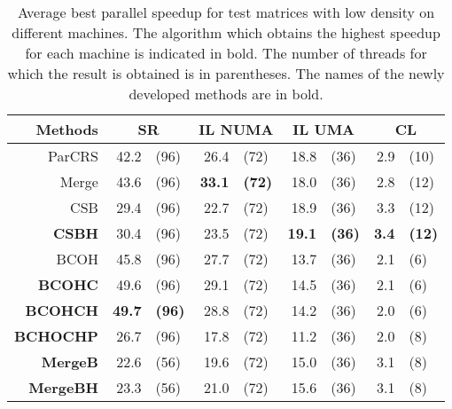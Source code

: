 \begin{table}
    \centering
    \small
    \caption{Average best parallel speedup for test matrices with low density on different machines. The algorithm which obtains the highest speedup for each machine is indicated in bold. The number of threads for which the result is obtained is in parentheses. The names of the newly developed methods are in bold.}\label{tab:AggregateResultsL}
    \begin{tabular}{r r@{ }l r@{ }l r@{ }lr@{ }l }
        Methods & \multicolumn{2}{c}{SR} & \multicolumn{2}{c}{IL NUMA} & \multicolumn{2}{c}{IL UMA} & \multicolumn{2}{c}{CL}\\
        \midrule
        ParCRS           & 42.2          & (96)          & 26.4          & (72)          & 18.8          & (36)          & 2.9          & (10) \\
        Merge            & 43.6          & (96)          & \textbf{33.1} & \textbf{(72)} & 18.0          & (36)          & 2.8          & (12) \\
        CSB              & 29.4          & (96)          & 22.7          & (72)          & 18.9          & (36)          & 3.3          & (12) \\
        \textbf{CSBH}    & 30.4          & (96)          & 23.5          & (72)          & \textbf{19.1} & \textbf{(36)} & \textbf{3.4} & \textbf{(12)} \\
        BCOH             & 45.8          & (96)          & 27.7          & (72)          & 13.7          & (36)          & 2.1          & (6) \\
        \textbf{BCOHC}   & 49.6          & (96)          & 29.1          & (72)          & 14.5          & (36)          & 2.1          & (6) \\
        \textbf{BCOHCH}  & \textbf{49.7} & \textbf{(96)} & 28.8          & (72)          & 14.2          & (36)          & 2.0          & (6) \\
        \textbf{BCHOCHP} & 26.7          & (96)          & 17.8          & (72)          & 11.2          & (36)          & 2.0          & (8) \\
        \textbf{MergeB}  & 22.6          & (56)          & 19.6          & (72)          & 15.0          & (36)          & 3.1          & (8) \\
        \textbf{MergeBH} & 23.3          & (56)          & 21.0          & (72)          & 15.6          & (36)          & 3.1          & (8) \\
    \end{tabular}
\end{table}